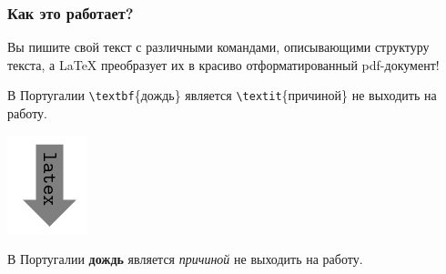 \documentclass[newPxFont]{beamer}
\begin{document}
\begin{frame}[fragile]
\frametitle{Как это работает?}
Вы пишите свой текст с различными \alert{командами}, описывающими структуру текста, а \LaTeX{} преобразует их в красиво отформатированный pdf-документ!

\begin{mdframed}[backgroundcolor=LTXLightGreen]
В Португалии \verb|\textbf|\{дождь\} является \verb|\textit|\{причиной\}  не выходить на работу.
\end{mdframed}

\centering
   \includegraphics[scale=0.3]{fuc.png}%

\begin{mdframed}[backgroundcolor=LTXLightGreen] 
В Португалии \textbf{дождь} является \textit{причиной} не выходить на работу.
\end{mdframed}   
\end{frame}
\end{document}
